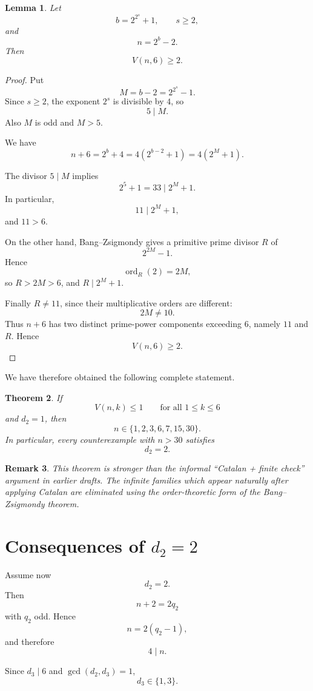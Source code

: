 \documentclass[11pt]{article}
\newtheorem{theorem}{Theorem}[section]
\newtheorem{lemma}[theorem]{Lemma}
\newtheorem{remark}[theorem]{Remark}
\newcommand{\ord}{\operatorname{ord}}
\begin{document}
\begin{lemma}\label{lem:fermatbranch}
Let
\[
b=2^{2^s}+1,\qquad s\geq2,
\]
and
\[
n=2^b-2.
\]
Then
\[
V(n,6)\geq2.
\]
\end{lemma}

\begin{proof}
Put
\[
M=b-2=2^{2^s}-1.
\]
Since \(s\geq2\), the exponent \(2^s\) is divisible by \(4\), so
\[
5\mid M.
\]
Also \(M\) is odd and \(M>5\).

We have
\[
n+6
=
2^b+4
=
4(2^{b-2}+1)
=
4(2^M+1).
\]

The divisor \(5\mid M\) implies
\[
2^5+1=33\mid2^M+1.
\]
In particular,
\[
11\mid2^M+1,
\]
and \(11>6\).

On the other hand, Bang--Zsigmondy gives a primitive prime divisor \(R\)
of
\[
2^{2M}-1.
\]
Hence
\[
\ord_R(2)=2M,
\]
so \(R>2M>6\), and \(R\mid2^M+1\).

Finally \(R\neq11\), since their multiplicative orders are different:
\[
2M\neq10.
\]
Thus \(n+6\) has two distinct prime-power components exceeding \(6\),
namely \(11\) and \(R\). Hence
\[
V(n,6)\geq2.
\]
\end{proof}

We have therefore obtained the following complete statement.

\begin{theorem}\label{thm:d2one}
If
\[
V(n,k)\leq1
\qquad\text{for all }1\leq k\leq6
\]
and \(d_2=1\), then
\[
\boxed{
n\in\{1,2,3,6,7,15,30\}.
}
\]
In particular, every counterexample with \(n>30\) satisfies
\[
\boxed{d_2=2.}
\]
\end{theorem}

\begin{remark}
This theorem is stronger than the informal ``Catalan + finite check''
argument in earlier drafts.  The infinite families which appear naturally
after applying Catalan are eliminated using the order-theoretic form of the
Bang--Zsigmondy theorem.
\end{remark}

\section{Consequences of \(d_2=2\)}

Assume now
\[
d_2=2.
\]
Then
\[
n+2=2q_2
\]
with \(q_2\) odd. Hence
\[
n=2(q_2-1),
\]
and therefore
\[
\boxed{4\mid n.}
\tag{11}
\]

Since \(d_3\mid6\) and \(\gcd(d_2,d_3)=1\),
\[
\boxed{d_3\in\{1,3\}.}
\tag{12}
\]
\end{document}
